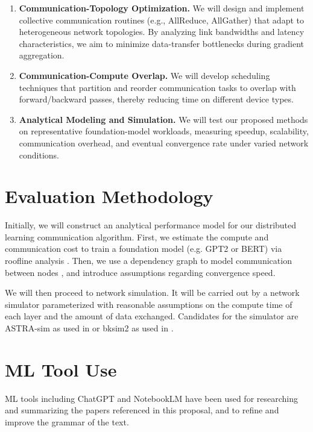 \documentclass{article}
\begin{document}
\begin{enumerate} 

\item \textbf{Communication-Topology Optimization.} We will design and implement collective communication routines (e.g., AllReduce, AllGather) that adapt to heterogeneous network topologies. By analyzing link bandwidths and latency characteristics, we aim to minimize data-transfer bottlenecks during gradient aggregation.

\item \textbf{Communication-Compute Overlap.} We will develop scheduling techniques that partition and reorder communication tasks to overlap with forward/backward passes, thereby reducing time on different device types.

\item \textbf{Analytical Modeling and Simulation.} 
We will test our proposed methods on representative foundation-model workloads, measuring speedup, scalability, communication overhead, and eventual convergence rate under varied network conditions. 

\end{enumerate}


\section{Evaluation Methodology}

Initially, we will construct an analytical performance model for our distributed learning communication algorithm. First, we estimate the compute and communication cost to train a foundation model (e.g. GPT2\cite{floridi2020gpt} or BERT\cite{devlin2018bert}) via roofline analysis \cite{scaling-book}. Then, we use a dependency graph to model communication between nodes \cite{neglia2019role}, and introduce assumptions regarding convergence speed.

We will then proceed to network simulation. It will be carried out by a network simulator parameterized with reasonable assumptions on the compute time of each layer and the amount of data exchanged. Candidates for the simulator are ASTRA-sim as used in \cite{won2024tacos} or bksim2 as used in \cite{9138924}.

\printbibliography

\appendix

\section*{ML Tool Use}

ML tools including ChatGPT and NotebookLM have been used for researching and summarizing the papers referenced in this proposal, and to refine and improve the grammar of the text. 
\end{document}
